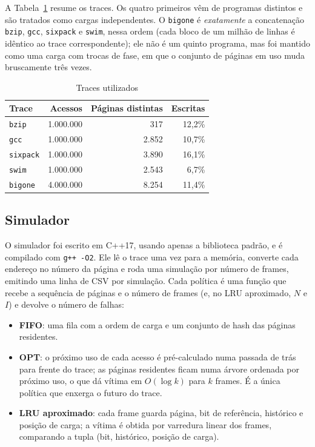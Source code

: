 \documentclass[12pt]{article}
\begin{document}
A Tabela~\ref{tab:traces} resume os traces. Os quatro primeiros vêm de
programas distintos e são tratados como cargas independentes. O
\texttt{bigone} é \emph{exatamente} a concatenação \texttt{bzip}, \texttt{gcc},
\texttt{sixpack} e \texttt{swim}, nessa ordem (cada bloco de um milhão de
linhas é idêntico ao trace correspondente); ele não é um quinto programa, mas
foi mantido como uma carga com trocas de fase, em que o conjunto de páginas em
uso muda bruscamente três vezes.

\begin{table}[ht]
\centering
\caption{Traces utilizados}
\label{tab:traces}
\begin{tabular}{lrrr}
\hline
Trace & Acessos & Páginas distintas & Escritas \\
\hline
\texttt{bzip}    & 1.000.000 &   317 & 12,2\% \\
\texttt{gcc}     & 1.000.000 & 2.852 & 10,7\% \\
\texttt{sixpack} & 1.000.000 & 3.890 & 16,1\% \\
\texttt{swim}    & 1.000.000 & 2.543 &  6,7\% \\
\texttt{bigone}  & 4.000.000 & 8.254 & 11,4\% \\
\hline
\end{tabular}
\end{table}

\subsection{Simulador}

O simulador foi escrito em C++17, usando apenas a biblioteca padrão, e é
compilado com \texttt{g++ -O2}. Ele lê o trace uma vez para a memória, converte
cada endereço no número da página e roda uma simulação por número de frames,
emitindo uma linha de CSV por simulação. Cada política é uma função que recebe
a sequência de páginas e o número de frames (e, no LRU aproximado, $N$ e $I$) e
devolve o número de falhas:

\begin{itemize}
  \item \textbf{FIFO}: uma fila com a ordem de carga e um conjunto de hash das
    páginas residentes.
  \item \textbf{OPT}: o próximo uso de cada acesso é pré-calculado numa passada
    de trás para frente do trace; as páginas residentes ficam numa árvore
    ordenada por próximo uso, o que dá vítima em $O(\log k)$ para $k$ frames.
    É a única política que enxerga o futuro do trace.
  \item \textbf{LRU aproximado}: cada frame guarda página, bit de referência,
    histórico e posição de carga; a vítima é obtida por varredura linear dos
    frames, comparando a tupla (bit, histórico, posição de carga).
\end{itemize}
\end{document}
